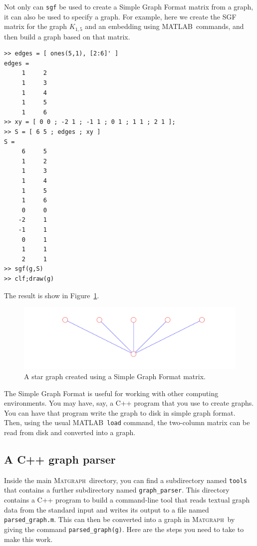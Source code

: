 \documentclass[12pt]{amsart}
\newcommand\matlab{MATLAB}
\newcommand\matgraph{\textsc{Matgraph}}
\begin{document}
Not only can \verb|sgf| be used to create a Simple Graph Format matrix
from a graph, it can also be used to specify a graph. For example,
here we create the SGF matrix for the graph $K_{1,5}$ and an embedding
using \matlab\ commands, and then build a graph based on that matrix.
\begin{verbatim}
>> edges = [ ones(5,1), [2:6]' ]
edges =
     1     2
     1     3
     1     4
     1     5
     1     6
>> xy = [ 0 0 ; -2 1 ; -1 1 ; 0 1 ; 1 1 ; 2 1 ];
>> S = [ 6 5 ; edges ; xy ]
S =
     6     5
     1     2
     1     3
     1     4
     1     5
     1     6
     0     0
    -2     1
    -1     1
     0     1
     1     1
     2     1
>> sgf(g,S)
>> clf;draw(g)
\end{verbatim}
The result is show in Figure~\ref{fig:star}.
\begin{figure}[ht]
  \begin{center}
    \includegraphics[scale=0.5]{figs/star}
  \end{center}
  \caption{A star graph created using a Simple Graph Format matrix.}
  \label{fig:star}
\end{figure}

The Simple Graph Format is useful for working with other computing
environments. You may have, say, a C++ program that you use to create
graphs. You can have that program write the graph to disk in simple
graph format. Then, using the usual \matlab\ \verb|load| command, the
two-column matrix can be read from disk and converted into a graph.



\subsection{A C++ graph parser} 
Inside the main \matgraph\ directory, you can find a subdirectory
named \verb|tools| that contains a further subdirectory named
\verb|graph_parser|. This directory contains a C++ program to build a
command-line tool that reads textual graph data from the standard
input and writes its output to a file named
\verb|parsed_graph.m|. This can then be converted into a graph in
\matgraph\ by giving the command \verb|parsed_graph(g)|. Here are the
steps you need to take to make this work.
\end{document}
